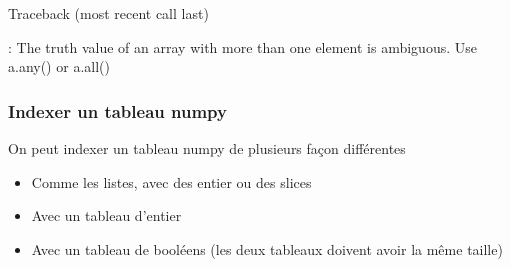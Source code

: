 \documentclass[letterpaper,10pt,english]{sphinxhowto}
\begin{document}
\begin{sphinxVerbatim}[commandchars=\\\{\}]
Traceback (most recent call last)
  
   
  
       

: The truth value of an array with more than one element is ambiguous. Use a.any() or a.all()
\end{sphinxVerbatim}


\subsubsection{Indexer un tableau numpy}
\label{\detokenize{cours5_numpy_cours:indexer-un-tableau-numpy}}
\sphinxAtStartPar
On peut indexer un tableau numpy de plusieurs façon différentes
\begin{itemize}
\item {} 
\sphinxAtStartPar
Comme les listes, avec des entier ou des slices

\item {} 
\sphinxAtStartPar
Avec un tableau d’entier

\item {} 
\sphinxAtStartPar
Avec un tableau de booléens (les deux tableaux doivent avoir la même taille)

\end{itemize}
\end{document}

